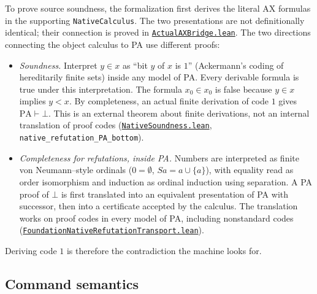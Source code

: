 \documentclass[11pt,letterpaper]{article}
\newcommand{\PA}{\mathrm{PA}}
\newcommand{\src}[2]{\href{https://github.com/jamesyc/BusyBeaver/blob/main/#1}{\texttt{\nolinkurl{#2}}}}
\newcommand{\repo}[1]{\texttt{\nolinkurl{#1}}}
\begin{document}
To prove source soundness, the formalization first derives the literal AX
formulas in the supporting \texttt{NativeCalculus}. The two presentations
are not definitionally identical; their connection is proved in
\src{Lean/metamathematics/PA215PA/ActualAXBridge.lean}{ActualAXBridge.lean}.
The two directions connecting the object calculus to PA use different proofs:
\begin{itemize}
\item \emph{Soundness.} Interpret $y\in x$ as ``bit $y$ of $x$ is $1$''
(Ackermann's coding of hereditarily finite sets) inside any model of PA.
Every derivable formula is true under this interpretation. The formula
$x_0\in x_0$ is false because $y\in x$ implies $y<x$. By completeness,
an actual finite derivation of code $1$ gives $\PA\vdash\bot$. This is an
external theorem about finite derivations, not an internal translation of
proof codes
(\src{Lean/metamathematics/PA215PA/NativeSoundness.lean}{NativeSoundness.lean},
\repo{native_refutation_PA_bottom}).
\item \emph{Completeness for refutations, inside PA.} Numbers are interpreted as
finite von Neumann--style ordinals ($0=\emptyset$, $S a=a\cup\{a\}$), with
equality read as order isomorphism and induction as ordinal induction
using separation. A PA proof of $\bot$ is first translated into an equivalent
presentation of PA with successor, then into a certificate accepted by
the calculus. The translation works on proof codes in every model of PA,
including nonstandard codes
(\src{Lean/metamathematics/PA215PA/FoundationNativeRefutationTransport.lean}{FoundationNativeRefutationTransport.lean}).
\end{itemize}
Deriving code $1$ is therefore the contradiction the machine looks for.

\subsection{Command semantics}
\end{document}
